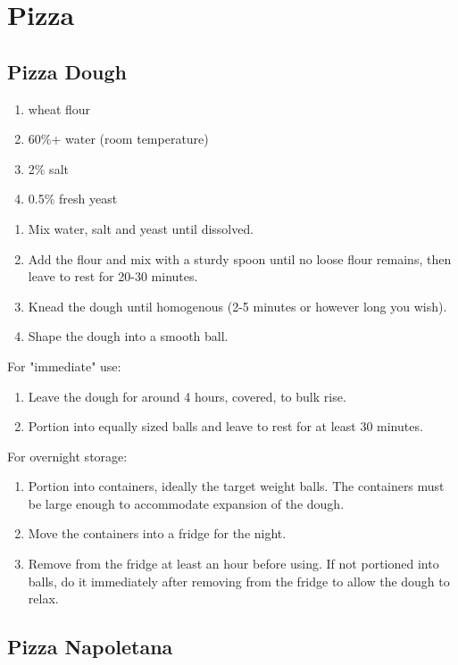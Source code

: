\chapter{Pizza}

\section{Pizza Dough} \label{pizza-dough}
\begin{enumerate}
  \item wheat flour
  \item 60\%+ water (room temperature)
  \item 2\% salt
  \item 0.5\% fresh yeast
\end{enumerate}

\begin{enumerate}
  \item Mix water, salt and yeast until dissolved.
  \item Add the flour and mix with a sturdy spoon until no loose flour remains,
    then leave to rest for 20-30 minutes.
  \item Knead the dough until homogenous (2-5 minutes or however long you wish).
  \item Shape the dough into a smooth ball.
  \saveenum
\end{enumerate}
For "immediate" use:
\begin{enumerate}
  \contenum
  \item Leave the dough for around 4 hours, covered, to bulk rise.
  \item Portion into equally sized balls and leave to rest for at least 30
    minutes.
\end{enumerate}
For overnight storage:
\begin{enumerate}
  \contenum
  \item Portion into containers, ideally the target weight balls. The
    containers must be large enough to accommodate expansion of the dough.
  \item Move the containers into a fridge for the night.
  \item Remove from the fridge at least an hour before using. If not portioned
    into balls, do it immediately after removing from the fridge to allow the
    dough to relax.
\end{enumerate}

\section{Pizza Napoletana}

